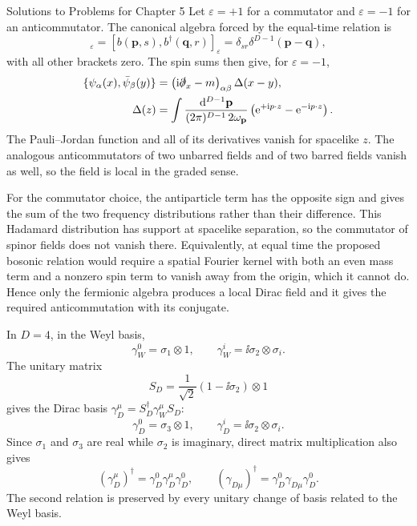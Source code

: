 \begin{bankssolutions}{Solutions to Problems for Chapter 5}
Let $\varepsilon=+1$ for a commutator and $\varepsilon=-1$ for an
anticommutator. The canonical algebra forced by the equal-time relation is
\begin{equation*}
 [a(\mathbf p,s),a^\dagger(\mathbf q,r)]_\varepsilon
 =[b(\mathbf p,s),b^\dagger(\mathbf q,r)]_\varepsilon
 =\delta_{sr}\delta^{D-1}(\mathbf p-\mathbf q),
\end{equation*}
with all other brackets zero. The spin sums then give, for $\varepsilon=-1$,
\begin{equation*}
\begin{aligned}
 \{\psi_\alpha(x),\bar\psi_\beta(y)\}
  &=\left(\mathrm{i}\slashed\partial_x-m\right)_{\alpha\beta}\Delta(x-y),\\
 \Delta(z)&=\int\frac{\mathop{}\!\mathrm{d}^{D-1}\mathbf p}{(2\pi)^{D-1}\,2\omega_{\mathbf p}}
  \left(\mathrm{e}^{+\mathrm{i} p\cdot z}-\mathrm{e}^{-\mathrm{i} p\cdot z}\right).
\end{aligned}
\end{equation*}
The Pauli--Jordan function and all of its derivatives vanish for spacelike $z$.
The analogous anticommutators of two unbarred fields and of two barred fields
vanish as well, so the field is local in the graded sense.

For the commutator choice, the antiparticle term has the opposite sign and gives
the sum of the two frequency distributions rather than their difference. This
Hadamard distribution has support at spacelike separation, so the commutator of
spinor fields does not vanish there. Equivalently, at equal time the proposed
bosonic relation would require a spatial Fourier kernel with both an even mass
term and a nonzero spin term to vanish away from the origin, which it cannot do.
Hence only the fermionic algebra produces a local Dirac field and it gives the
required anticommutation with its conjugate.

In $D=4$, in the Weyl basis,
\begin{equation*}
 \gamma_W^0=\sigma_1\otimes1,
 \qquad \gamma_W^i=\ii\sigma_2\otimes\sigma_i.
\end{equation*}
The unitary matrix
\begin{equation*}
 S_D=\frac1{\sqrt2}(1-\ii\sigma_2)\otimes1
\end{equation*}
gives the Dirac basis $\gamma_D^\mu=S_D^\dagger\gamma_W^\mu S_D$:
\begin{equation*}
 \gamma_D^0=\sigma_3\otimes1,
 \qquad \gamma_D^i=\ii\sigma_2\otimes\sigma_i.
\end{equation*}
Since $\sigma_1$ and $\sigma_3$ are real while $\sigma_2$ is imaginary, direct
matrix multiplication also gives
\begin{equation*}
 (\gamma_D^\mu)^\dagger=\gamma_D^0\gamma_D^\mu\gamma_D^0,
 \qquad
 (\gamma_{D\mu})^\dagger=\gamma_D^0\gamma_{D\mu}\gamma_D^0.
\end{equation*}
The second relation is preserved by every unitary change of basis related to the
Weyl basis.


\end{bankssolutions}
